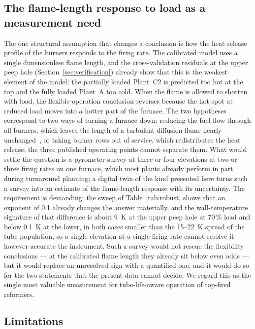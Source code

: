 \documentclass[final,3p,times]{elsarticle}
\begin{document}
\subsection{The flame-length response to load as a measurement need}
\label{sec:flame}

The one structural assumption that changes a conclusion is how the heat-release profile of the burners responds to the firing rate. The calibrated model uses a single dimensionless flame length, and the cross-validation residuals at the upper peep hole (Section~\ref{sec:verification}) already show that this is the weakest element of the model: the partially loaded Plant~C2 is predicted too hot at the top and the fully loaded Plant~A too cold. When the flame is allowed to shorten with load, the flexible-operation conclusion reverses because the hot spot at reduced load moves into a hotter part of the furnace. The two hypotheses correspond to two ways of turning a furnace down: reducing the fuel flow through all burners, which leaves the length of a turbulent diffusion flame nearly unchanged~\cite{hawthorne1949}, or taking burner rows out of service, which redistributes the heat release; the three published operating points cannot separate them. What would settle the question is a pyrometer survey at three or four elevations at two or three firing rates on one furnace, which most plants already perform in part during turnaround planning; a digital twin of the kind presented here turns such a survey into an estimate of the flame-length response with its uncertainty. The requirement is demanding: the sweep of Table~\ref{tab:robust} shows that an exponent of 0.1 already changes the answer materially, and the wall-temperature signature of that difference is about 9~K at the upper peep hole at 70\,\% load and below 0.1~K at the lower, in both cases smaller than the 15--22~K spread of the tube population, so a single elevation at a single firing rate cannot resolve it however accurate the instrument. Such a survey would not rescue the flexibility conclusions --- at the calibrated flame length they already sit below even odds --- but it would replace an unresolved sign with a quantified one, and it would do so for the two statements that the present data cannot decide. We regard this as the single most valuable measurement for tube-life-aware operation of top-fired reformers.

\subsection{Limitations}
\end{document}
